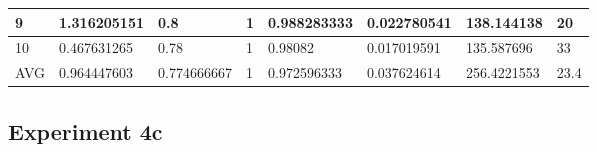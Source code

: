 \begin{table}[H]
\begin{adjustbox}{max width=340pt,keepaspectratio,angle=90}
\begin{tabular}{|l|l|l|l|l|l|l|l|}
					9           & 1.316205151 & 0.8         & 1           & 0.988283333 & 0.022780541 & 138.144138  & 20                                     \\ \hline
					10          & 0.467631265 & 0.78        & 1           & 0.98082     & 0.017019591 & 135.587696  & 33                                     \\ \hline
					AVG         & 0.964447603 & 0.774666667 & 1           & 0.972596333 & 0.037624614 & 256.4221553 & 23.4                                   \\ \hline
				\end{tabular}
			\end{adjustbox}	
		\end{table}
	\subsection{Experiment 4c}
	\label{sec:A_Exp4c}
